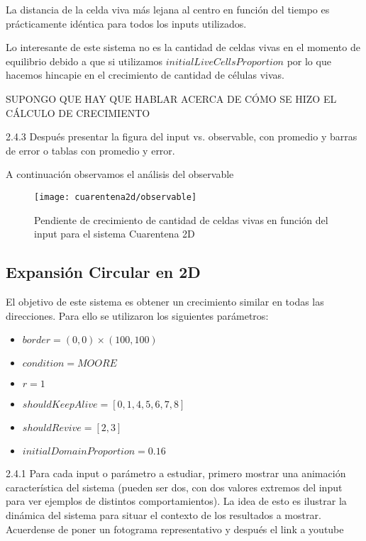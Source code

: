 La distancia de la celda viva más lejana al centro en función del tiempo es prácticamente idéntica para todos los inputs utilizados.

Lo interesante de este sistema no es la cantidad de celdas vivas en el momento de equilibrio debido a que si utilizamos $initialLiveCellsProportion$
por lo que hacemos hincapie en el crecimiento de cantidad de células vivas.

SUPONGO QUE HAY QUE HABLAR ACERCA DE CÓMO SE HIZO EL CÁLCULO DE CRECIMIENTO 


2.4.3 Después presentar la figura del input vs. observable, con promedio y barras de error o tablas 
con promedio y error. 

A continuación observamos el análisis del observable

\begin{figure}[H]
    \centering
    \texttt{[image: cuarentena2d/observable]}
    \caption{Pendiente de crecimiento de cantidad de celdas vivas en función del input para el sistema Cuarentena 2D}
    \label{fig:cuarentena2d_observable}
\end{figure}







\subsection{Expansión Circular en 2D}\label{subsec:expansion-circular-2D}

El objetivo de este sistema es obtener un crecimiento similar en todas las direcciones. Para ello se utilizaron los siguientes parámetros:

\begin{itemize}
    \item $border = (0, 0) \times (100, 100)$
    \item $condition = MOORE$
    \item $r = 1$
    \item $shouldKeepAlive = [0, 1, 4, 5, 6, 7, 8]$
    \item $shouldRevive = [2, 3]$
    \item $initialDomainProportion = 0.16$
\end{itemize}

2.4.1 Para cada input o parámetro a estudiar, primero mostrar una animación característica del 
sistema (pueden ser dos, con dos valores extremos del input para ver ejemplos de distintos 
comportamientos). La idea de esto es ilustrar la dinámica del sistema para situar el contexto de los 
resultados a mostrar. Acuerdense de poner un fotograma representativo y después el link a youtube 

